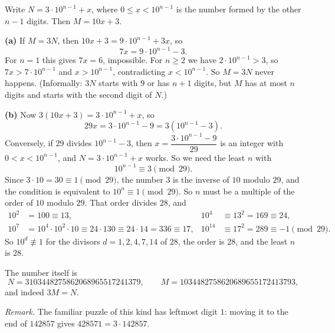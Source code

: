 Write $N=3\cdot10^{n-1}+x$, where $0\le x<10^{n-1}$ is the number formed by the other $n-1$ digits. Then $M=10x+3$.

\textbf{(a)} If $M=3N$, then $10x+3=9\cdot10^{n-1}+3x$, so
\[7x=9\cdot10^{n-1}-3 .\]
For $n=1$ this gives $7x=6$, impossible. For $n\ge2$ we have $2\cdot10^{n-1}>3$, so $7x>7\cdot10^{n-1}$ and $x>10^{n-1}$, contradicting $x<10^{n-1}$. So $M=3N$ never happens. (Informally: $3N$ starts with $9$ or has $n+1$ digits, but $M$ has at most $n$ digits and starts with the second digit of $N$.)

\textbf{(b)} Now $3(10x+3)=3\cdot10^{n-1}+x$, so
\[29x=3\cdot10^{n-1}-9=3\left(10^{n-1}-3\right).\]
Conversely, if $29$ divides $10^{n-1}-3$, then $x=\dfrac{3\cdot10^{n-1}-9}{29}$ is an integer with $0<x<10^{n-1}$, and $N=3\cdot10^{n-1}+x$ works. So we need the least $n$ with
\[10^{n-1}\equiv3\pmod{29}.\]
Since $3\cdot10=30\equiv1\pmod{29}$, the number $3$ is the inverse of $10$ modulo $29$, and the condition is equivalent to $10^{n}\equiv1\pmod{29}$. So $n$ must be a multiple of the order of $10$ modulo $29$. That order divides $28$, and
\begin{align*}
10^2&=100\equiv13, & 10^4&\equiv13^2=169\equiv24,\\
10^7&=10^4\cdot10^2\cdot10\equiv24\cdot130\equiv24\cdot14=336\equiv17, & 10^{14}&\equiv17^2=289\equiv-1\pmod{29}.
\end{align*}
So $10^d\not\equiv1$ for the divisors $d=1,2,4,7,14$ of $28$, the order is $28$, and the least $n$ is $\boxed{28}$.

The number itself is
\[N=3103448275862068965517241379,\qquad M=1034482758620689655172413793,\]
and indeed $3M=N$.

\emph{Remark.} The familiar puzzle of this kind has leftmost digit $1$: moving it to the end of $142857$ gives $428571=3\cdot142857$.
